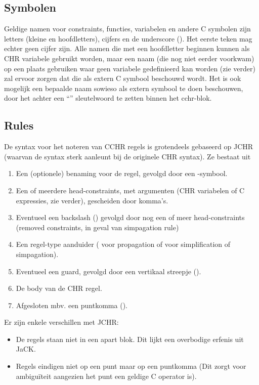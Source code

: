 \subsection{Symbolen}

Geldige namen voor constraints, functies, variabelen en andere C symbolen zijn letters (kleine en hoofdletters), cijfers en de underscore (\code{\_}). Het eerste teken mag echter geen cijfer zijn. Alle namen die met een hoofdletter beginnen kunnen als CHR variabele gebruikt worden, maar een naam (die nog niet eerder voorkwam) op een plaats gebruiken waar geen variabele gedefinieerd kan worden (zie verder) zal ervoor zorgen dat die als extern C symbool beschouwd wordt. Het is ook mogelijk een bepaalde naam sowieso als extern symbool te doen beschouwen, door het achter een ``'' sleutelwoord te zetten binnen het cchr-blok.

\subsection{Rules} \label{sec:rules}

De syntax voor het noteren van CCHR regels is grotendeels gebaseerd op JCHR (waarvan de syntax sterk aanleunt bij de
originele CHR syntax). Ze bestaat uit \begin{enumerate}
  \item Een (optionele) benaming voor de regel, gevolgd door een -symbool.
  \item Een of meerdere head-constraints, met argumenten (CHR variabelen of C expressies, zie verder), gescheiden door komma's.
  \item Eventueel een backslash (\code{$\backslash$}) gevolgd door nog een of meer head-constraints (removed constraints, in geval van simpagation rule)
  \item Een regel-type aanduider (\code{==>} voor propagation of \code{<=>} voor simplification of simpagation).
  \item Eventueel een guard, gevolgd door een vertikaal streepje (\code{|}).
  \item De body van de CHR regel.
  \item Afgesloten mbv. een puntkomma (\code{;}).
\end{enumerate}

Er zijn enkele verschillen met JCHR: \begin{itemize}
  \item De regels staan niet in een apart  blok. Dit lijkt een overbodige erfenis uit JaCK.
  \item Regels eindigen niet op een punt maar op een puntkomma (Dit zorgt voor ambigu\"iteit aangezien het punt een geldige
        C operator is).
\end{itemize}


